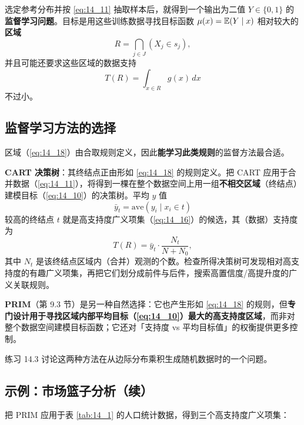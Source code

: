 选定参考分布并按 \eqref{eq:14_11} 抽取样本后，就得到一个输出为二值 $Y\in\{0,1\}$ 的\textbf{监督学习问题}。目标是用这些训练数据寻找目标函数 $\mu(x)=\mathbb{E}(Y\mid x)$ 相对较大的\textbf{区域}
\begin{equation}
R = \bigcap_{j\in J} (X_j\in s_j), \label{eq:14_18}
\end{equation}
并且可能还要求这些区域的数据支持
\begin{equation}
T(R) = \int_{x\in R} g(x)\,dx \label{eq:14_19}
\end{equation}
不过小。

\subsection{监督学习方法的选择}

区域（\eqref{eq:14_18}）由合取规则定义，因此\textbf{能学习此类规则}的监督方法最合适。

\textbf{CART 决策树}：其终结点正由形如 \eqref{eq:14_18} 的规则定义。把 CART 应用于合并数据（\eqref{eq:14_11}），将得到一棵在整个数据空间上用一组\textbf{不相交区域}（终结点）建模目标（\eqref{eq:14_10}）的决策树。平均 $y$ 值
\[
\bar y_t = \mathrm{ave}(y_i \mid x_i \in t)
\]
较高的终结点 $t$ 就是高支持度广义项集（\eqref{eq:14_16}）的候选，其（数据）支持度为
\[
T(R) = \bar y_t \cdot \frac{N_t}{N+N_0},
\]
其中 $N_t$ 是该终结点区域内（合并）观测的个数。检查所得决策树可发现相对高支持度的有趣广义项集，再把它们划分成前件与后件，搜索高置信度/高提升度的广义关联规则。

\textbf{PRIM}（第 9.3 节）是另一种自然选择：它也产生形如 \eqref{eq:14_18} 的规则，但\textbf{专门设计用于寻找区域内部平均目标（\eqref{eq:14_10}）最大的高支持度区域}，而非对整个数据空间建模目标函数；它还对「支持度 vs 平均目标值」的权衡提供更多控制。

练习 14.3 讨论这两种方法在从边际分布乘积生成随机数据时的一个问题。

\subsection{示例：市场篮子分析（续）}

把 PRIM 应用于表 \ref{tab:14_1} 的人口统计数据，得到三个高支持度广义项集：

